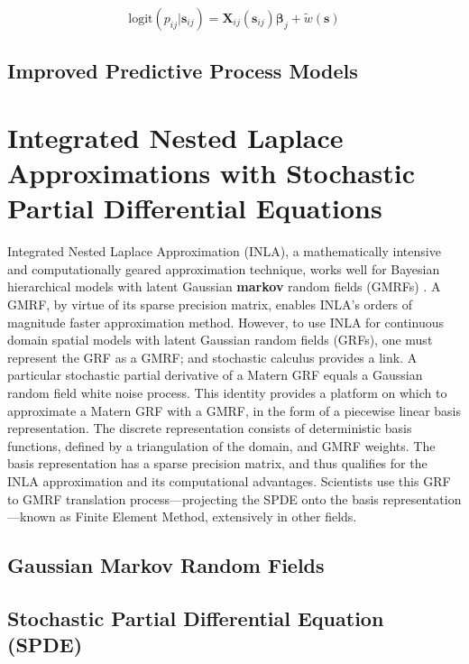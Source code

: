 \begin{equation}
\text{logit}(p_{ij}|\pmb{s}_{ij}) = \pmb{X}_{ij}(\pmb{s}_{ij}) \pmb{\beta}_{j} + \tilde{w}(\pmb{s})
\end{equation}

\subsection{Improved Predictive Process Models}


\section{Integrated Nested Laplace Approximations with Stochastic Partial Differential Equations} %
Integrated Nested Laplace Approximation (INLA), a mathematically intensive and computationally geared approximation technique, works well for Bayesian hierarchical models with latent Gaussian {\bf markov} random fields (GMRFs) \citep{Rue2007}. A GMRF, by virtue of its sparse precision matrix, enables INLA's orders of magnitude faster approximation method. However, to use INLA for continuous domain spatial models with latent Gaussian random fields (GRFs), one must represent the GRF as a GMRF; and stochastic calculus provides a link. A particular stochastic partial derivative of a Matern GRF equals a Gaussian random field white noise process. This identity provides a platform on which to approximate a Matern GRF with a GMRF, in the form of a piecewise linear basis representation. The discrete representation consists of deterministic basis functions, defined by a triangulation of the domain, and GMRF weights. The basis representation has a sparse precision matrix, and thus qualifies for the INLA approximation and its computational advantages. Scientists use this GRF to GMRF translation process---projecting the SPDE onto the basis representation---known as Finite Element Method, extensively in other fields. 
\subsection{Gaussian Markov Random Fields}

\subsection{Stochastic Partial Differential Equation (SPDE)} 


